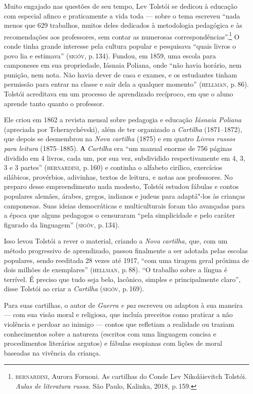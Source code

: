 Muito engajado nas questões de seu tempo, Lev Tolstói se dedicou à
educação com especial afinco e praticamente a vida toda --- sobre o tema
escreveu ``nada menos que 629 trabalhos, muitos deles dedicados à
metodologia pedagógica e às recomendações aos professores, sem contar as
numerosas correspondências''.\footnote{\textsc{bernardini}, Aurora Fornoni. As
  cartilhas do Conde Lev Nikoláievitch Tolstói. \emph{Aulas de
  literatura russa}. São Paulo, Kalinka, 2018, p.\,159.} O conde
tinha grande interesse pela cultura popular e pesquisava ``quais livros
o povo lia e estimava'' (\textsc{sigóv}, p.\,134). Fundou, em 1859, uma escola
para camponeses em sua propriedade, Iásnaia Poliana, onde ``não
havia horário, nem punição, nem nota. Não havia dever de casa e exames,
e os estudantes tinham permissão para entrar na classe e sair dela a
qualquer momento'' (\textsc{hellman}, p.\,86). Tolstói acreditava em um processo
de aprendizado recíproco, em que o aluno aprende tanto quanto o
professor.

Ele criou em 1862 a revista mensal sobre pedagogia e educação
\emph{Iásnaia Poliana} (apreciada por Tchernychévski), além de ter
organizado a \emph{Cartilha} (1871--1872), que depois se desmembrou na
\emph{Nova cartilha} (1875) e em quatro \emph{Livros russos para
leitura} (1875--1885). А \emph{Cartilha} era ``um manual enorme
de 756 páginas dividido em 4 livros, cada um, por sua vez, subdividido
respectivamente em 4, 3, 3 e 3 partes'' (\textsc{bernardini}, p.\,160) e continha
o alfabeto cirílico, exercícios silábicos, provérbios, adivinhas, textos
de leitura, e notas aos professores. No preparo desse empreendimento
nada modesto, Tolstói estudou fábulas e contos populares alemães,
árabes, gregos, indianos e judeus para adaptá"-los às crianças
camponesas. Suas ideias democráticas e multiculturais foram tão avançadas para a época que alguns pedagogos o censuraram ``pela
simplicidade e pelo caráter figurado da linguagem'' (\textsc{sigóv}, p.\,134).

Isso levou Tolstói a rever o material, criando a \emph{Nova cartilha,}
que, com um método progressivo de aprendizado, passou finalmente a ser
adotada pelas escolas populares, sendo reeditada 28 vezes até 1917,
``com uma tiragem geral próxima de dois milhões de
exemplares'' (\textsc{hellman}, p.\,88). ``O trabalho sobre a língua é terrível. É
preciso que tudo seja belo, lacônico, simples e principalmente claro'',
disse Tolstói ao criar a \emph{Cartilha} (\textsc{sigóv}, p.\,169).

Para suas cartilhas, o autor de \emph{Guerra e paz} escreveu ou adaptou
à sua maneira --- com sua visão moral e religiosa, que incluía preceitos
como praticar a não violência e perdoar ao inimigo --- contos que
refletiam a realidade ou traziam conhecimentos sobre a natureza (escritos
com uma linguagem concisa e procedimentos literários argutos) e fábulas
esopianas com lições de moral baseadas na vivência da criança.

